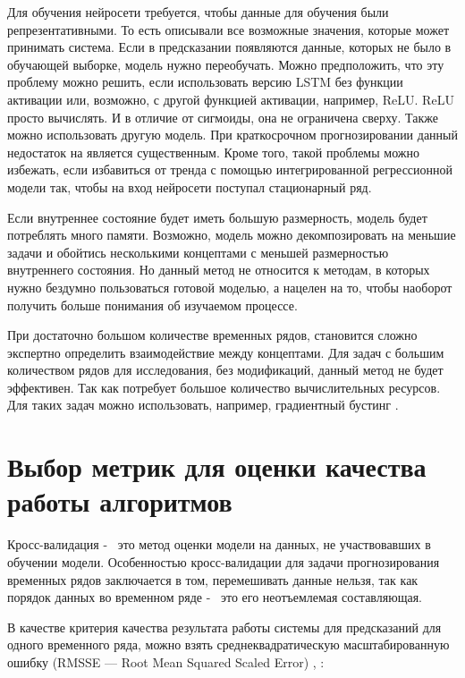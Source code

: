 Для обучения  нейросети требуется, чтобы
данные для обучения были репрезентативными. То есть
описывали все возможные значения, которые может принимать система.
Если в предсказании появляются данные, которых не было в обучающей выборке,
модель нужно переобучать. Можно предположить, что эту проблему можно решить,
если использовать версию LSTM без функции активации или, возможно, с другой
функцией активации, например, ReLU. ReLU просто вычислять. И в отличие от
сигмоиды, она не ограничена сверху. Также можно использовать другую модель.
При краткосрочном прогнозировании данный недостаток на является существенным.
Кроме того, такой проблемы можно избежать, если избавиться от тренда с
помощью интегрированной регрессионной модели так, чтобы на вход нейросети
поступал стационарный ряд.

Если внутреннее состояние будет иметь большую размерность,
модель будет потреблять много памяти. Возможно, модель можно
декомпозировать на меньшие задачи и обойтись несколькими концептами
с меньшей размерностью внутреннего состояния.
Но данный метод не относится к методам, в которых нужно бездумно
пользоваться готовой моделью, а нацелен на то, чтобы наоборот
получить больше понимания об изучаемом процессе.

При достаточно большом количестве временных рядов,
становится сложно экспертно определить взаимодействие между концептами.
Для задач с большим количеством рядов для исследования, без
модификаций, данный метод не будет эффективен. Так как потребует
большое количество вычислительных ресурсов.
Для таких задач можно использовать, например, градиентный бустинг \cite{friedman2002stochastic}.

\section{Выбор метрик для оценки качества работы алгоритмов}

Кросс-валидация -~ это метод оценки модели на данных, не участвовавших
в обучении модели. Особенностью кросс-валидации для задачи прогнозирования
временных рядов заключается в том, перемешивать данные нельзя,
так как порядок данных во временном ряде -~ это его неотъемлемая составляющая.

В качестве критерия качества результата работы системы для предсказаний
для одного временного ряда, можно взять среднеквадратическую
масштабированную ошибку (RMSSE --- Root Mean Squared Scaled Error) \cite{hyndman2006another}, \cite{shcherbakov2013survey}:

